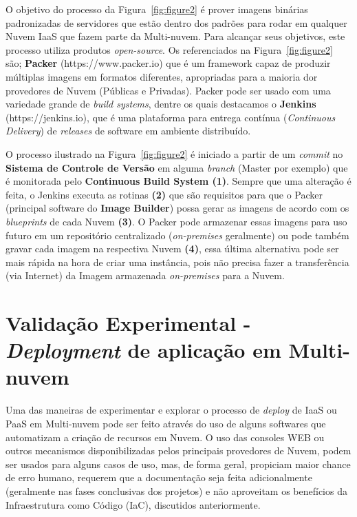 \documentclass[12pt]{article}
\begin{document}
	O objetivo do processo da Figura~\ref{fig:figure2} é prover imagens binárias padronizadas de servidores que estão dentro dos padrões para rodar em qualquer Nuvem IaaS que fazem parte da Multi-nuvem. Para alcançar seus objetivos, este processo utiliza produtos \textit{open-source}. Os referenciados na Figura~\ref{fig:figure2} são; \textbf{Packer} (https://www.packer.io) que é um framework capaz de produzir múltiplas imagens em formatos diferentes, apropriadas para a maioria dor provedores de Nuvem (Públicas e Privadas). Packer pode ser usado com uma variedade grande de \textit{build systems}, dentre os quais destacamos o \textbf{Jenkins} (https://jenkins.io), que é uma plataforma para entrega contínua (\textit{Continuous Delivery}) de \textit{releases} de software em ambiente distribuído.

	O processo ilustrado na Figura~\ref{fig:figure2} é iniciado a partir de um \textit{commit} no \textbf{Sistema de Controle de Versão} em alguma \textit{branch} (Master por exemplo) que é monitorada pelo \textbf{Continuous Build System (1)}. Sempre que uma alteração é feita, o Jenkins executa as rotinas \textbf{(2)} que são requisitos para que o Packer (principal software do \textbf{Image Builder}) possa gerar as imagens de acordo com os \textit{blueprints} de cada Nuvem \textbf{(3)}. O Packer pode armazenar essas imagens para uso futuro em um repositório centralizado (\textit{on-premises} geralmente) ou pode também gravar cada imagem na respectiva Nuvem \textbf{(4)}, essa última alternativa pode ser mais rápida na hora de criar uma instância, pois não precisa fazer a transferência (via Internet) da Imagem armazenada \textit{on-premises} para a Nuvem.
	
	\section{Validação Experimental - \textit{Deployment} de aplicação em Multi-nuvem}
	
	Uma das maneiras de experimentar e explorar o processo de \textit{deploy} de IaaS ou PaaS em Multi-nuvem pode ser feito através do uso de alguns softwares que automatizam a criação de recursos em Nuvem. O uso das consoles WEB ou outros mecanismos disponibilizadas pelos principais provedores de Nuvem, podem ser usados para alguns casos de uso, mas, de forma geral,  propiciam maior chance de erro humano, requerem que a documentação seja feita adicionalmente (geralmente nas fases conclusivas dos projetos) e não aproveitam os benefícios da Infraestrutura como Código (IaC), discutidos anteriormente.
	
\end{document}
